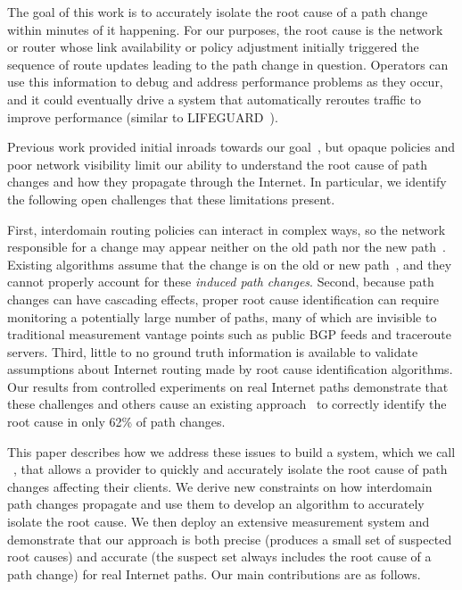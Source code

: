 The goal of this work is to
accurately isolate the root cause of a path change within minutes of it happening.
For our purposes, the root cause is the network or router whose link availability or policy adjustment initially triggered the sequence of route updates leading to the path change in question. 
Operators can use 
this information to debug and address performance problems as they occur, and it could eventually drive a system that 
automatically reroutes traffic to improve performance (similar to LIFEGUARD~\cite{lifeguard}). 

Previous work provided initial inroads towards our goal~\cite{feldman,caesar},
but opaque policies and poor network visibility limit our ability to understand the root cause of path 
changes and how they propagate through the Internet. 
In particular, we identify the 
following open challenges that these limitations present.

First, interdomain routing policies can interact in complex ways, 
so the network responsible for a change may appear neither on the old path nor the new path~\cite{feldman}. Existing algorithms assume that the change is on the old or new path~\cite{feldman,caesar}, and they cannot properly account for these {\em induced path changes}. 
Second, because path changes can have cascading effects, 
 proper root cause identification can require monitoring a potentially large number 
of paths, many of which are invisible to traditional measurement vantage points such as public BGP 
feeds and traceroute servers. Third, little to no ground truth information is available to validate 
assumptions about Internet routing made by root cause identification algorithms. 
Our results from controlled experiments on real Internet paths demonstrate that these challenges and others cause an existing approach~\cite{feldman} to correctly identify the root cause in only 62\% of path changes.

This paper describes how 
we address these issues to build a system, which we call
\ouralgo~\cite{poiroot}, that allows a provider to 
quickly and accurately isolate the root cause of path changes affecting their clients.
We derive new constraints on how interdomain path changes propagate and use them to develop an algorithm to accurately isolate the root cause. We then deploy an 
extensive measurement system and demonstrate that our approach is both precise (\ie produces a small set of suspected root causes) 
and  accurate (\ie the suspect set always includes 
the root cause of a path change) for real Internet paths. 
Our main contributions are as follows.

